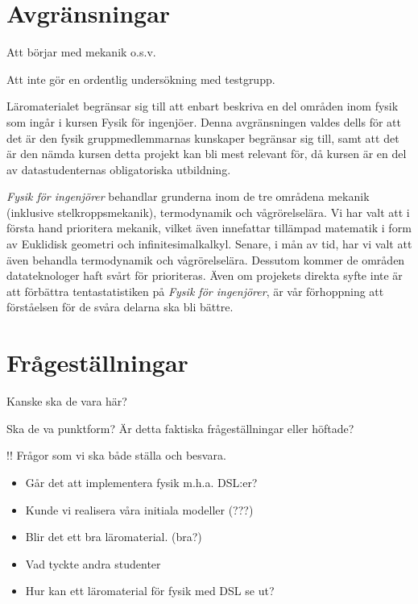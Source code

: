 \section{Avgränsningar}

\begin{binge}

Att börjar med mekanik o.s.v.

Att inte gör en ordentlig undersökning med testgrupp.

Läromaterialet begränsar sig till att enbart beskriva en del områden inom fysik som ingår i kursen Fysik för ingenjöer. Denna avgränsningen valdes dells för att det är den fysik gruppmedlemmarnas kunskaper begränsar sig till, samt att det är den nämda kursen detta projekt kan bli mest relevant för, då kursen är en del av datastudenternas obligatoriska utbildning.

\textit{Fysik för ingenjörer} behandlar grunderna inom de tre områdena mekanik (inklusive stelkroppsmekanik), termodynamik och vågrörelselära. Vi har valt att i första hand prioritera mekanik, vilket även innefattar tillämpad matematik i form av Euklidisk geometri och infinitesimalkalkyl. Senare, i mån av tid, har vi valt att även behandla termodynamik och vågrörelselära. Dessutom kommer de områden datateknologer haft svårt för prioriteras. Även om projekets direkta syfte inte är att förbättra tentastatistiken på \textit{Fysik för ingenjörer}, är vår förhoppning att förståelsen för de svåra delarna ska bli bättre.

\end{binge}

\section{Frågeställningar}

\begin{binge}

Kanske ska de vara här?

Ska de va punktform? Är detta faktiska frågeställningar eller höftade?

!! Frågor som vi ska både ställa och besvara.
\begin{itemize}
  \item Går det att implementera fysik m.h.a. DSL:er?
  \item Kunde vi realisera våra initiala modeller (???)
  \item Blir det ett bra läromaterial. (bra?)
  \item Vad tyckte andra studenter      
  \item Hur kan ett läromaterial för fysik med DSL se ut?
\end{itemize}

\end{binge}

